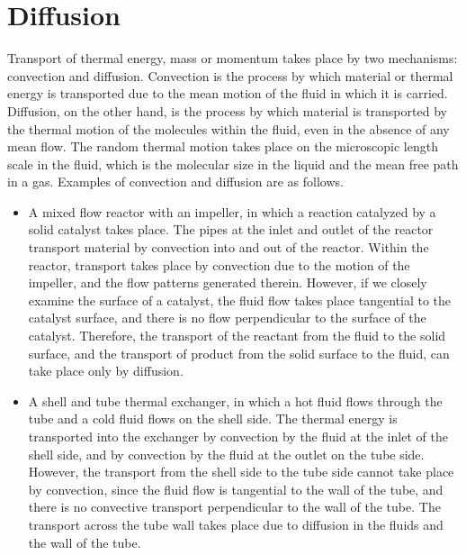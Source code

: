 \section{Diffusion}
Transport of thermal energy, mass or momentum takes place by two mechanisms: convection and diffusion. Convection is the process by which material or thermal energy is transported due to the mean motion of the fluid in which it is carried. Diffusion, on the other hand, is the process by which material is transported by the thermal motion of the molecules within the fluid, even in the absence of any mean flow. The random thermal motion takes place on the microscopic length scale in the fluid, which is the molecular size in the liquid and the mean free path in a gas. Examples of convection and diffusion are as follows.

\begin{itemize}
\item A mixed flow reactor with an impeller, in which a reaction catalyzed by a solid catalyst takes place. The pipes at the inlet and outlet of the reactor transport material by convection into and out of the reactor. Within the reactor, transport takes place by convection due to the motion of the impeller, and the flow patterns generated therein. However, if we closely examine the surface of a catalyst, the fluid flow takes place tangential to the catalyst surface, and there is no flow perpendicular to the surface of the catalyst. Therefore, the transport of the reactant from the fluid to the solid surface, and the transport of product from the solid surface to the fluid, can take place only by diffusion.
%
\item A shell and tube thermal exchanger, in which a hot fluid flows through the tube and a cold fluid flows on the shell side. The thermal energy is transported into the exchanger by convection by the fluid at the inlet of the shell side, and by convection by the fluid at the outlet on the tube side. However, the transport from the shell side to the tube side cannot take place by convection, since the fluid flow is tangential to the wall of the tube, and there is no convective transport perpendicular to the wall of the tube. The transport across the tube wall takes place due to diffusion in the fluids and the wall of the tube.
%

\end{itemize}
